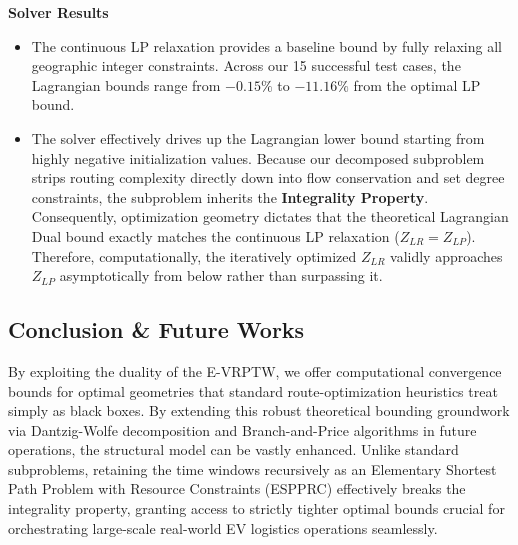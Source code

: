 \documentclass[11pt]{article}
\begin{document}
\textbf{Solver Results}
\begin{itemize}
    \item The continuous LP relaxation provides a baseline bound by fully relaxing all geographic integer constraints. Across our 15 successful test cases, the Lagrangian bounds range from $-0.15\%$ to $-11.16\%$ from the optimal LP bound.
    \item The solver effectively drives up the Lagrangian lower bound starting from highly negative initialization values. Because our decomposed subproblem strips routing complexity directly down into flow conservation and set degree constraints, the subproblem inherits the \textbf{Integrality Property}. Consequently, optimization geometry dictates that the theoretical Lagrangian Dual bound exactly matches the continuous LP relaxation ($Z_{LR} = Z_{LP}$). Therefore, computationally, the iteratively optimized $Z_{LR}$ validly approaches $Z_{LP}$ asymptotically from below rather than surpassing it.
\end{itemize}

\subsection{Conclusion \& Future Works}
By exploiting the duality of the E-VRPTW, we offer computational convergence bounds for optimal geometries that standard route-optimization heuristics treat simply as black boxes. By extending this robust theoretical bounding groundwork via Dantzig-Wolfe decomposition and Branch-and-Price algorithms in future operations, the structural model can be vastly enhanced. Unlike standard subproblems, retaining the time windows recursively as an Elementary Shortest Path Problem with Resource Constraints (ESPPRC) effectively breaks the integrality property, granting access to strictly tighter optimal bounds crucial for orchestrating large-scale real-world EV logistics operations seamlessly.
\end{document}
